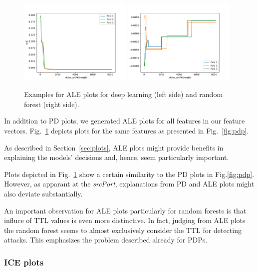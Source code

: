 \documentclass[sigconf,nonacm]{acmart}
\begin{document}
\begin{figure}[p]
\includegraphics[width=0.48\textwidth]{plots/ale/apply(stdev(ipTotalLength),forward)_nn.pdf}
\includegraphics[width=0.48\textwidth]{plots/ale/apply(stdev(ipTotalLength),forward)_rf.pdf}

\caption{Examples for ALE plots for deep learning (left side) and random forest (right side).}
\label{fig:ale}
\end{figure}

In addition to PD plots, we generated ALE plots for all features in our feature vectors. Fig.~\ref{fig:ale} depicts plots for the same features as presented in Fig.~\ref{fig:pdp}.

As described in Section~\ref{sec:plots}, ALE plots might provide benefits in explaining the models' decisions and, hence, seem particularly important.

Plots depicted in Fig.~\ref{fig:ale} show a certain similarity to the PD plots in Fig.\ref{fig:pdp}. However, as apparant at the \textit{srcPort}, explanations from PD and ALE plots might also deviate substantially. 

An important observation for ALE plots particularly for random forests is that influce of TTL values is even more distinctive. In fact, judging from ALE plots the random forest seems to almost exclusively consider the TTL for detecting attacks. This emphasizes the problem described already for PDPs.

\subsubsection{ICE plots}
\end{document}
